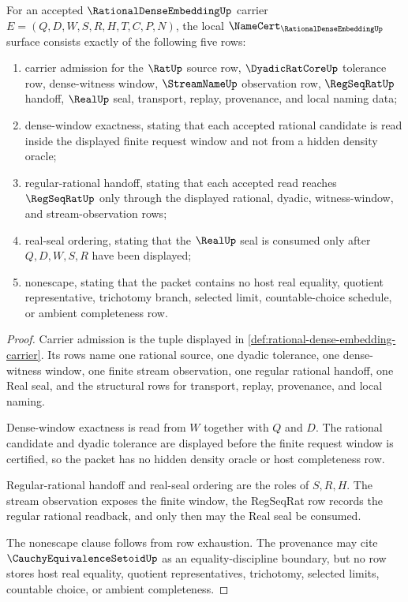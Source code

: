 \begin{theorem}
\label{thm:rational-dense-embedding-namecert-obligations}
For an accepted $\RationalDenseEmbeddingUp$ carrier $E=(Q,D,W,S,R,H,T,C,P,N)$, the local $\NameCert_{\RationalDenseEmbeddingUp}$ surface consists exactly of the following five rows:
\begin{enumerate}
\item carrier admission for the $\RatUp$ source row, $\DyadicRatCoreUp$ tolerance row, dense-witness window, $\StreamNameUp$ observation row, $\RegSeqRatUp$ handoff, $\RealUp$ seal, transport, replay, provenance, and local naming data;
\item dense-window exactness, stating that each accepted rational candidate is read inside the displayed finite request window and not from a hidden density oracle;
\item regular-rational handoff, stating that each accepted read reaches $\RegSeqRatUp$ only through the displayed rational, dyadic, witness-window, and stream-observation rows;
\item real-seal ordering, stating that the $\RealUp$ seal is consumed only after $Q,D,W,S,R$ have been displayed;
\item nonescape, stating that the packet contains no host real equality, quotient representative, trichotomy branch, selected limit, countable-choice schedule, or ambient completeness row.
\end{enumerate}
\end{theorem}
\begin{proof}
Carrier admission is the tuple displayed in \autoref{def:rational-dense-embedding-carrier}. Its rows name one rational source, one dyadic tolerance, one dense-witness window, one finite stream observation, one regular rational handoff, one Real seal, and the structural rows for transport, replay, provenance, and local naming.

Dense-window exactness is read from $W$ together with $Q$ and $D$. The rational candidate and dyadic tolerance are displayed before the finite request window is certified, so the packet has no hidden density oracle or host completeness row.

Regular-rational handoff and real-seal ordering are the roles of $S,R,H$. The stream observation exposes the finite window, the RegSeqRat row records the regular rational readback, and only then may the Real seal be consumed.

The nonescape clause follows from row exhaustion. The provenance may cite $\CauchyEquivalenceSetoidUp$ as an equality-discipline boundary, but no row stores host real equality, quotient representatives, trichotomy, selected limits, countable choice, or ambient completeness.
\end{proof}

